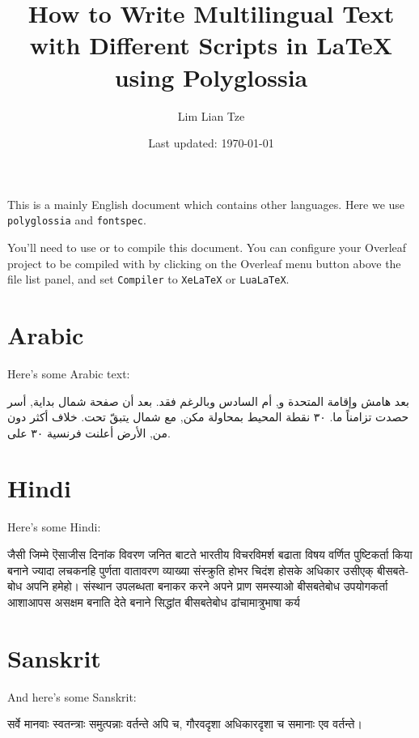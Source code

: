 \documentclass[12pt]{scrartcl}
\title{How to Write Multilingual Text with Different Scripts in \LaTeX{} using Polyglossia}
\author{Lim Lian Tze}
\date{Last updated: \today}
\begin{document}
\maketitle

This is a mainly English document which contains other languages. Here we use \texttt{polyglossia} and \texttt{fontspec}.

You'll need to use  or  to compile this document. You can configure your Overleaf project to be compiled with  by clicking on the Overleaf menu button above the file list panel, and set \texttt{Compiler} to \texttt{XeLaTeX} or \texttt{LuaLaTeX}.



\section{Arabic}
Here's some Arabic text:

\begin{Arabic}
بعد هامش وإقامة المتحدة و, أم السادس وبالرغم فقد. بعد أن صفحة شمال بداية, أسر حصدت تزامناً ما. ٣٠ نقطة المحيط بمحاولة مكن, مع شمال يتبقّ تحت. خلاف أكثر دون من, الأرض أعلنت فرنسية ٣٠ على.
\end{Arabic}



\section{Hindi}

Here's some Hindi:

\begin{hindi}
जैसी जिम्मे ऎसाजीस दिनांक विवरण जनित बाटते भारतीय विचरविमर्श बढाता विषय वर्णित पुष्टिकर्ता किया बनाने ज्यादा लचकनहि पुर्णता वातावरण व्याख्या संस्क्रुति होभर चिदंश होसके अधिकार उसीएक् बीसबतेबोध अपनि हमेहो। संस्थान उपलब्धता बनाकर करने अपने प्राण समस्याओ बीसबतेबोध उपयोगकर्ता आशाआपस असक्षम बनाति देते बनाने सिद्धांत बीसबतेबोध ढांचामात्रुभाषा कर्य
\end{hindi}

\section{Sanskrit}
And here's some Sanskrit:

\begin{sanskrit}
सर्वे मानवाः स्वतन्त्राः समुत्पन्नाः वर्तन्ते अपि च, गौरवदृशा अधिकारदृशा च समानाः एव वर्तन्ते।
\end{sanskrit}
\end{document}

